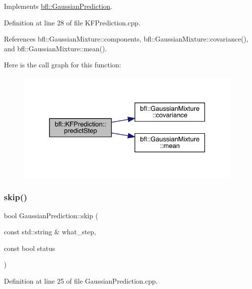Implements \mbox{\hyperlink{classbfl_1_1GaussianPrediction_a35e7c490378c9bb48e4becad7fdcb2a1}{bfl\+::\+Gaussian\+Prediction}}.



Definition at line 28 of file K\+F\+Prediction.\+cpp.



References bfl\+::\+Gaussian\+Mixture\+::components, bfl\+::\+Gaussian\+Mixture\+::covariance(), and bfl\+::\+Gaussian\+Mixture\+::mean().

Here is the call graph for this function\+:
\nopagebreak
\begin{figure}[H]
\begin{center}
\leavevmode
\includegraphics[width=318pt]{classbfl_1_1KFPrediction_aa71d6b8ac030c54e86d3e91a94bb2db9_cgraph}
\end{center}
\end{figure}
\mbox{\label{classbfl_1_1GaussianPrediction_ae647821cf920ea81f981ebc9260cdbe6}} 
\subsubsection{\texorpdfstring{skip()}{skip()}}
{\footnotesize\ttfamily bool Gaussian\+Prediction\+::skip (\begin{DoxyParamCaption}\item[{const std\+::string \&}]{what\+\_\+step,  }\item[{const bool}]{status }\end{DoxyParamCaption})\hspace{0.3cm}{\ttfamily [inherited]}}



Definition at line 25 of file Gaussian\+Prediction.\+cpp.



